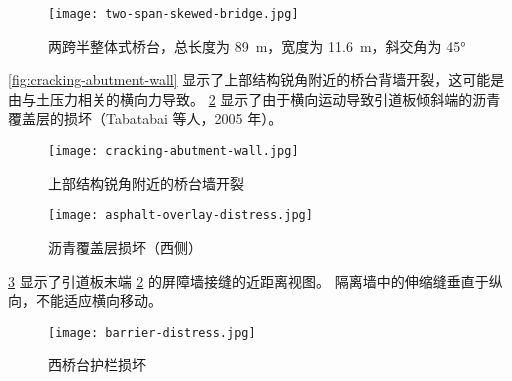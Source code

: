 \begin{figure}
  \texttt{[image: two-span-skewed-bridge.jpg]}
  \caption{两跨半整体式桥台，总长度为 \qty{89}{m}，宽度为 \qty{11.6}{m}，斜交角为 \ang{45}}
  \label{fig:two-span-skewed-bridge}
\end{figure}

\cref{fig:cracking-abutment-wall} 显示了上部结构锐角附近的桥台背墙开裂，这可能是由与土压力相关的横向力导致。
\cref{fig:asphalt-overlay-distress} 显示了由于横向运动导致引道板倾斜端的沥青覆盖层的损坏（Tabatabai 等人，2005 年）。

\begin{figure}
  \begin{minipage}{0.5\linewidth}\centering
    \texttt{[image: cracking-abutment-wall.jpg]}
    \caption{上部结构锐角附近的桥台墙开裂}
    \label{fig:cracking-abutment-wall}
  \end{minipage}%
  \begin{minipage}{0.5\linewidth}\centering
    \texttt{[image: asphalt-overlay-distress.jpg]}
    \caption{沥青覆盖层损坏（西侧）}
    \label{fig:asphalt-overlay-distress}
  \end{minipage}
\end{figure}

\cref{fig:barrier-distress} 显示了引道板末端 \cref{fig:asphalt-overlay-distress} 的屏障墙接缝的近距离视图。 隔离墙中的伸缩缝垂直于纵向，不能适应横向移动。

\begin{figure}
  \texttt{[image: barrier-distress.jpg]}
  \caption{西桥台护栏损坏}
  \label{fig:barrier-distress}
\end{figure}

